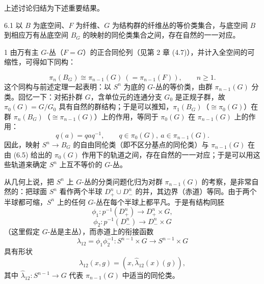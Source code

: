 上述讨论归结为下述重要结果。

\begin{theorem*}{6.1}
以 $B$ 为底空间、$F$ 为纤维、$G$ 为结构群的纤维丛的等价类集合，与底空间 $B$ 到相应万有丛底空间 $B_G$ 的映射的同伦类集合之间，存在自然的一一对应。
\end{theorem*}


\begin{example}{1}
由万有主 $G$-丛（$F=G$）的正合同伦列（见第 2 章 (4.7)），并计入全空间的可缩性，可得如下同构：

\begin{equation}
\pi_n(B_G)\cong\pi_{n-1}(G)\ (=\pi_{n-1}(F)),\qquad n\ge 1. \tag{6.4}
\end{equation}
这个同构与前述定理一起表明：以 $S^n$ 为底的 $G$-丛的等价类，由群 $\pi_{n-1}(G)$ 分类。回忆一下：对拓扑群 $G$，含单位元的连通分支 $G_0$ 是正规子群，故 $\pi_0(G)=G/G_0$ 具有自然的群结构；于是可以推知，$\pi_1(B_G)$（$\cong\pi_0(G)$）在群 $\pi_n(B_G)$（$\cong\pi_{n-1}(G)$）上的作用，等同于 $\pi_0(G)$ 在 $\pi_{n-1}(G)$ 上的作用：
\begin{equation}
q(a)=qaq^{-1},\qquad q\in\pi_0(G),\ a\in\pi_{n-1}(G). \tag{6.5}
\end{equation}
因此，映射 $S^n\to B_G$ 的自由同伦类（即不区分基点的同伦类）与 $\pi_{n-1}(G)$ 在由 (6.5) 给出的 $\pi_0(G)$ 作用下的轨道之间，存在自然的一一对应；于是可以用这些轨道来确定 $S^n$ 上互不等价的 $G$-丛。

从几何上说，把 $S^n$ 上 $G$-丛的分类问题化归为对群 $\pi_{n-1}(G)$ 的考察，是非常自然的：把球面 $S^n$ 看作两个半球 $D^n_+\cup D^n_-$ 的并，其边界（赤道）等同。由于两个半球都可缩，$S^n$ 上的任何 $G$-丛在每个半球上都平凡。于是有结构同胚
\[
\phi_1:p^{-1}(D^n_+)\longrightarrow D^n_+\times G,
\]
\[
\phi_2:p^{-1}(D^n_-)\longrightarrow D^n_-\times G
\]
（这里假定 $G$-丛是主丛），而赤道上的衔接函数
\[
\lambda_{12}=\phi_1\phi_2^{-1}:S^{n-1}\times G\longrightarrow S^{n-1}\times G
\]
具有形状
\[
\lambda_{12}(x,g)=(x,\hat\lambda_{12}(x)(g)),
\]
其中 $\hat\lambda_{12}:S^{n-1}\to G$ 代表 $\pi_{n-1}(G)$ 中适当的同伦类。
\end{example}


